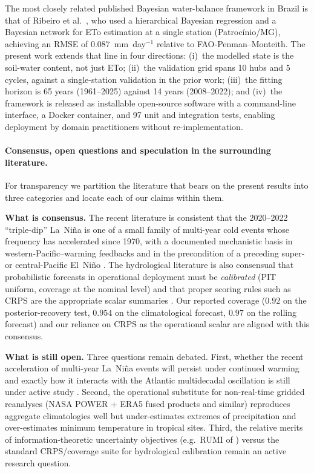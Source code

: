 \documentclass[review,5p,times]{elsarticle}
\begin{document}
The most closely related published Bayesian water-balance framework
in Brazil is that of Ribeiro et al.~\cite{Ribeiro2023}, who used a
hierarchical Bayesian regression and a Bayesian network for
ETo estimation at a single station (Patroc\'inio/MG), achieving an
RMSE of $0.087$~mm~day$^{-1}$ relative to FAO-Penman--Monteith. The
present work extends that line in four directions:
(i)~the modelled state is the soil-water content, not just ETo;
(ii)~the validation grid spans 10 hubs and 5 cycles, against a
single-station validation in the prior work;
(iii)~the fitting horizon is 65 years (1961--2025) against 14 years
(2008--2022); and
(iv)~the framework is released as installable open-source software
with a command-line interface, a Docker container, and 97 unit and
integration tests, enabling deployment by domain practitioners
without re-implementation.

\paragraph{Consensus, open questions and speculation in the
surrounding literature.} For transparency we partition the
literature that bears on the present results into three categories
and locate each of our claims within them.

\textbf{What is consensus.} The recent literature is consistent
that the 2020--2022 ``triple-dip'' La~Ni\~na is one of a small
family of multi-year cold events whose frequency has accelerated
since 1970, with a documented mechanistic basis in
western-Pacific--warming feedbacks and in the precondition of a
preceding super- or central-Pacific El~Ni\~no
\citep{Wang2023MultiyearLaNina,Geng2023ConsecutiveLaNina}. The
hydrological literature is also consensual that probabilistic
forecasts in operational deployment must be \emph{calibrated} (PIT
uniform, coverage at the nominal level) and that proper scoring
rules such as CRPS are the appropriate scalar summaries
\citep{Hersbach2000,GneitingRaftery2007}. Our reported coverage
($0.92$ on the posterior-recovery test, $0.954$ on the
climatological forecast, $0.97$ on the rolling forecast) and our
reliance on CRPS as the operational scalar are aligned with this
consensus.

\textbf{What is still open.} Three questions remain debated. First,
whether the recent acceleration of multi-year La~Ni\~na events will
persist under continued warming and exactly how it interacts with
the Atlantic multidecadal oscillation is still under active study
\citep{Wang2023MultiyearLaNina}. Second, the operational substitute
for non-real-time gridded reanalyses (NASA POWER + ERA5 fused
products and similar) reproduces aggregate climatologies well but
under-estimates extremes of precipitation and over-estimates minimum
temperature in tropical sites. Third, the relative merits of
information-theoretic uncertainty objectives (e.g.\ RUMI of
\citealt{Pizarro2025RUMI}) versus the standard CRPS/coverage suite
for hydrological calibration remain an active research question.
\end{document}
